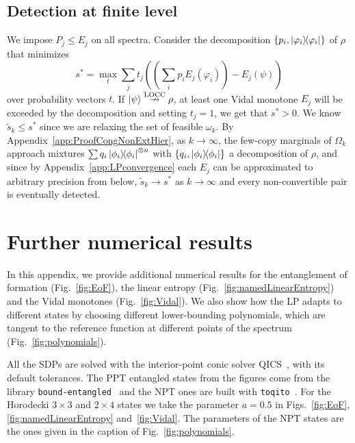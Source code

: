 \documentclass[11pt,a4paper]{report}
\newcounter{reptag}
\newif\iftags \tagsfalse   %
\newcommand{\reptagbox}[3]{\iftags\par\smallskip\noindent\refstepcounter{reptag}%
  \fcolorbox{#1}{#1!7}{\parbox{\dimexpr\linewidth-2\fboxsep-2\fboxrule\relax}{\small
  \textcolor{#1}{\textbf{[\thereptag]\ #2.}}\ #3}}\par\smallskip\fi}
\newcommand{\deeper}[1]{\reptagbox{tagP}{Deeper proof}{#1}}
\begin{document}
\section{Detection at finite level}\label{sec:loccDetection}
We impose $P_j\leq E_j$ on all spectra.
Consider the decomposition $\{p_i, \dyad{\varphi_i}\}$ of $\rho$ that minimizes
\begin{equation}
    s^*=\max_t \sum_j t_j \left( \left(\sum_i p_i E_j(\varphi_i)\right)  - E_j(\psi) \right)
\end{equation}
over probability vectors $t$.
If $\ket{\psi}\overset{\text{LOCC}}{\nrightarrow}\rho$, at least one Vidal monotone $E_j$ will be exceeded by the decomposition and setting $t_j=1$, we get that $s^*>0$.
We know $\widetilde{s}_k \leq s^*$ since we are relaxing the set of feasible $\omega_k$.
By Appendix~\ref{app:ProofCongNonExtHier}, as $k\to\infty$, the few-copy marginals of $\Omega_k$ approach mixtures $\sum q_i\dyad{\phi_i}^{\otimes n}$ with $\{q_i, \dyad{\phi_i}\}$ a decomposition of $\rho$, and since by Appendix~\ref{app:LPconvergence} each $E_j$ can be approximated to arbitrary precision from below, $\widetilde{s}_k \to s^*$ as $k \to \infty$ and every non-convertible pair is eventually detected.
\deeper{Tighten this proof. (i) A decomposition minimising $s^*$ exists because decompositions with at most $r^2$ terms form a compact set and the objective is continuous; say so. (ii) The convergence $\widetilde s_k\to s^*$ needs the polynomial approximations to be uniform in $j$ and the de Finetti step to hold for all $j$ at once; write the $\eta$/$\delta$ argument as in Appendix~\ref{app:LPconvergence}.}

\chapter{Further numerical results}\label{app:further}
In this appendix, we provide additional numerical results for the entanglement of formation (Fig.~\ref{fig:EoF}), the linear entropy (Fig.~\ref{fig:namedLinearEntropy}) and the Vidal monotones (Fig.~\ref{fig:Vidal}).
We also show how the LP adapts to different states by choosing different lower-bounding polynomials, which are tangent to the reference function at different points of the spectrum (Fig.~\ref{fig:polynomials}).

All the SDPs are solved with the interior-point conic solver QICS~\cite{qics}, with its default tolerances.
The PPT entangled states from the figures come from the library \texttt{bound-entangled}~\cite{boundEntangled} and the NPT ones are built with \texttt{toqito}~\cite{toqito}. For the Horodecki $3\times3$ and $2\times4$ states we take the parameter $a=0.5$ in Figs.~\ref{fig:EoF}, \ref{fig:namedLinearEntropy} and~\ref{fig:Vidal}. The parameters of the NPT states are the ones given in the caption of Fig.~\ref{fig:polynomials}.
\end{document}
